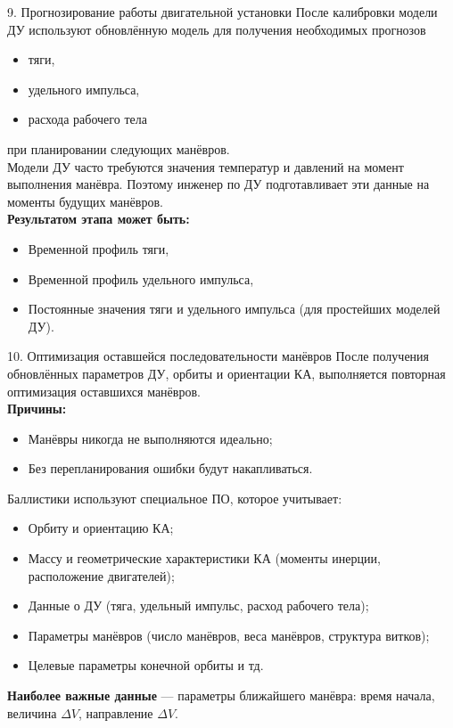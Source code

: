 \documentclass[8pt]{beamer}
\begin{document}
\begin{frame}{9. Прогнозирование работы двигательной установки}
После калибровки модели ДУ используют обновлённую модель для получения необходимых прогнозов
\begin{itemize}
    \item тяги,
    \item удельного импульса,
    \item расхода рабочего тела
\end{itemize}
при планировании следующих манёвров. \\
\smallskip
Модели ДУ часто требуются значения температур и давлений на момент выполнения манёвра. Поэтому инженер по ДУ подготавливает эти данные на моменты будущих манёвров. \\
\smallskip
\textbf{Результатом этапа может быть:}
\begin{itemize}
    \item Временной профиль тяги,
    \item Временной профиль удельного импульса,
    \item Постоянные значения тяги и удельного импульса (для простейших моделей ДУ).
\end{itemize}
\end{frame}

\begin{frame}{10. Оптимизация оставшейся последовательности манёвров}
После получения обновлённых параметров ДУ, орбиты и ориентации КА, выполняется повторная оптимизация оставшихся манёвров. \\
\smallskip
\textbf{Причины:}
\begin{itemize}
    \item Манёвры никогда не выполняются идеально;
    \item Без перепланирования ошибки будут накапливаться.
\end{itemize}
Баллистики используют специальное ПО, которое учитывает:
\begin{itemize}
    \item Орбиту и ориентацию КА;
    \item Массу и геометрические характеристики КА (моменты инерции, расположение двигателей);
    \item Данные о ДУ (тяга, удельный импульс, расход рабочего тела);
    \item Параметры манёвров (число манёвров, веса манёвров, структура витков);
    \item Целевые параметры конечной орбиты и тд.
\end{itemize}
\textbf{Наиболее важные данные} — параметры ближайшего манёвра: время начала, величина $\Delta V$, направление $\Delta V$.
\end{frame}
\end{document}
